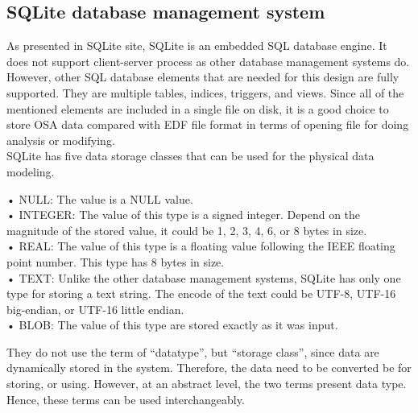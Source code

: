 \subsection{SQLite database management system}
As presented in SQLite site\cite{SQLITEORG}, SQLite is an embedded SQL database engine. It does not support client-server process as other database management systems do. However, other SQL database elements that are needed for this design are fully supported. They are multiple tables, indices, triggers, and views. Since all of the mentioned elements are included in a single file on disk, it is a good choice to store OSA data compared with EDF file format in terms of opening file for doing analysis or modifying.\\
SQLite has five data storage classes that can be used for the physical data modeling.
\begin{adjustwidth}{1cm}{}
•	NULL: The value is a NULL value.\\
•	INTEGER: The value of this type is a signed integer. Depend on the magnitude of the stored value, it could be 1, 2, 3, 4, 6, or 8 bytes in size.\\
•	REAL: The value of this type is a floating value following the IEEE floating point number. This type has 8 bytes in size.\\
•	TEXT: Unlike the other database management systems, SQLite has only one type for storing a text string. The encode of the text could be UTF-8, UTF-16 big-endian, or UTF-16 little endian.\\
•	BLOB: The value of this type are stored exactly as it was input.
\end{adjustwidth}
They do not use the term of “datatype”, but “storage class”, since data are dynamically stored in the system. Therefore, the data need to be converted be for storing, or using. However, at an abstract level, the two terms present data type. Hence, these terms can be used interchangeably.
